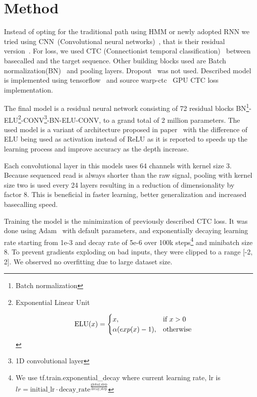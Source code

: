 \documentclass[runningheads,a4paper]{llncs}
\begin{document}
\section{Method}
Instead of opting for the traditional path using HMM or newly adopted RNN we tried using CNN~(Convolutional neural networks)~\cite{lecun-98}, that is their residual version~\cite{he2016deep}. For loss, we used CTC (Connectionist temporal classification)~\cite{graves2006connectionist} between basecalled and the target sequence. Other building blocks used are Batch normalization(BN)~\cite{BNORM} and pooling layers. Dropout~\cite{srivastava2014dropout} was not used. 
Described model is implemented using tensorflow~\cite{tensorflow2015-whitepaper} and source warp-ctc~\cite{warpctc} GPU CTC loss implementation.

The final model is a residual neural network consisting of 72 residual blocks BN\footnote{Batch normalization}-ELU\footnote{Exponential Linear Unit
	
	\begin{equation*}
	\text{ELU}(x)=
	\begin{cases}
	x, & \text{if}\ x>0 \\
	\alpha (exp(x) - 1), & \text{otherwise}
	\end{cases}    \\
	\end{equation*}
	
}-CONV\footnote{1D convolutional layer}-BN-ELU-CONV, to a grand total of 2 million parameters. The used model is a variant of architecture proposed in paper~\cite{identitet} with the difference of ELU being used as activation instead of ReLU as it is reported \cite{resnet-elu} to speeds up the learning process and improve accuracy as the depth increase.

Each convolutional layer in this models uses 64 channels with kernel size 3. Because sequenced read is always shorter than the raw signal, pooling with kernel size two is used every 24 layers resulting in a reduction of dimensionality by factor 8. This is beneficial in faster learning, better generalization and increased basecalling speed.

Training the model is the minimization of previously described CTC loss. It was done using Adam~\cite{adam} with default parameters, and exponentially decaying learning rate starting from 1e-3 and decay rate of 5e-6 over 100k steps\footnote{We use tf.train.exponential\_decay where current learning rate, lr is $lr=\text{initial\_lr} \cdot \text{decay\_rate}^\frac{\text{global\_step}}{\text{decay\_step}}$} and minibatch size 8. To prevent gradients exploding on bad inputs, they were clipped to a range [-2, 2]. We observed no overfitting due to large dataset size.
\end{document}

